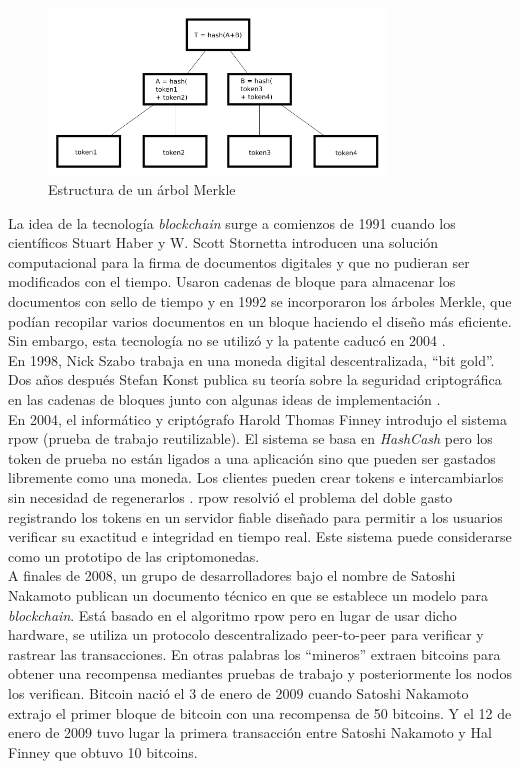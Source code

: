 \begin{figure}[H]
	\centering
	\includegraphics[width=0.8\textwidth]{figuras/arbol_merkle.png}
	\caption{Estructura de un árbol Merkle \cite{img-arbol-merkle}}
	\label{fig:arbol-Merkle}
\end{figure}

La idea de la tecnología \textit{blockchain} surge a comienzos de 1991 cuando los científicos Stuart Haber y W. Scott Stornetta introducen una solución computacional para la firma de documentos digitales y que no pudieran ser modificados con el tiempo. Usaron cadenas de bloque para almacenar los documentos con sello de tiempo y en 1992 se incorporaron los árboles Merkle, que podían recopilar varios documentos en un bloque haciendo el diseño más eficiente. Sin embargo, esta tecnología no se utilizó y la patente caducó en 2004 \cite{historia1-block}.\\

En 1998, Nick Szabo trabaja en una moneda digital descentralizada, ``bit gold''. Dos años después Stefan Konst publica su teoría sobre la seguridad criptográfica en las cadenas de bloques junto con algunas ideas de implementación \cite{historia2-block}.\\

En 2004, el informático y criptógrafo Harold Thomas Finney introdujo el sistema \acrshort{rpow} (prueba de trabajo reutilizable). El sistema se basa en \textit{HashCash} pero los token de prueba no están ligados a una aplicación sino que pueden ser gastados libremente como una moneda. Los clientes pueden crear tokens e intercambiarlos sin necesidad de regenerarlos \cite{RPoW}. \acrshort{rpow} resolvió el problema del doble gasto registrando los tokens en un servidor fiable diseñado para permitir a los usuarios verificar su exactitud e integridad en tiempo real. Este sistema puede considerarse como un prototipo de las criptomonedas.\\

A finales de 2008, un grupo de desarrolladores bajo el nombre de Satoshi Nakamoto publican un documento técnico en que se establece un modelo para \textit{blockchain}. Está basado en el algoritmo \acrshort{rpow} pero en lugar de usar dicho hardware, se utiliza un protocolo descentralizado peer-to-peer para verificar y rastrear las transacciones. En otras palabras los ``mineros'' extraen bitcoins para obtener una recompensa mediantes pruebas de trabajo y posteriormente los nodos los verifican. Bitcoin nació el 3 de enero de 2009 cuando Satoshi Nakamoto extrajo el primer bloque de bitcoin con una recompensa de 50 bitcoins. Y el 12 de enero de 2009 tuvo lugar la primera transacción entre Satoshi Nakamoto y Hal Finney que obtuvo 10 bitcoins.\\


